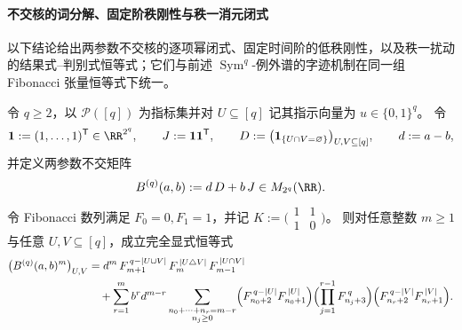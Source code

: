 \paragraph{不交核的词分解、固定阶秩刚性与秩一消元闭式}
以下结论给出两参数不交核的逐项幂闭式、固定时间阶的低秩刚性，以及秩一扰动的结果式--判别式恒等式；它们与前述 \(\operatorname{Sym}^q\)-例外谱的字迹机制在同一组 Fibonacci 张量恒等式下统一。

\begin{theorem}[两参数不交核的逐项幂闭式与词分解]\label{thm:conclusion-disjointness-power-word-decomposition}
令 \(q\ge 2\)，以 \(\mathcal P([q])\) 为指标集并对 \(U\subseteq[q]\) 记其指示向量为 \(u\in\{0,1\}^q\)。
令
\[
\mathbf 1:= (1,\dots,1)^{\mathsf T}\in\RR^{2^q},\qquad
J:=\mathbf 1\mathbf 1^{\mathsf T},\qquad
D:=\bigl(\mathbf 1_{\{U\cap V=\varnothing\}}\bigr)_{U,V\subseteq[q]},
\qquad
d:=a-b,
\]
并定义两参数不交矩阵
\[
B^{(q)}(a,b):=d\,D+b\,J\in M_{2^q}(\RR).
\]
令 Fibonacci 数列满足 \(F_0=0,F_1=1\)，并记
\(
K:=\bigl(\begin{smallmatrix}1&1\\[2pt]1&0\end{smallmatrix}\bigr)
\)。
则对任意整数 \(m\ge 1\) 与任意 \(U,V\subseteq[q]\)，成立完全显式恒等式
\begin{align}\label{eq:conclusion-disjointness-power-entrywise-closed-form}
\bigl(B^{(q)}(a,b)^m\bigr)_{U,V}
&=
d^{m}\,F_{m+1}^{\,q-|U\cup V|}\,F_{m}^{\,|U\triangle V|}\,F_{m-1}^{\,|U\cap V|}
\nonumber\\
&\quad+\sum_{r=1}^{m} b^{r}d^{m-r}
\sum_{\substack{n_0+\cdots+n_r=m-r\\ n_j\ge 0}}
\Bigl(F_{n_0+2}^{\,q-|U|}F_{n_0+1}^{\,|U|}\Bigr)
\Bigl(\prod_{j=1}^{r-1}F_{n_j+3}^{\,q}\Bigr)
\Bigl(F_{n_r+2}^{\,q-|V|}F_{n_r+1}^{\,|V|}\Bigr).
\end{align}
\end{theorem}
